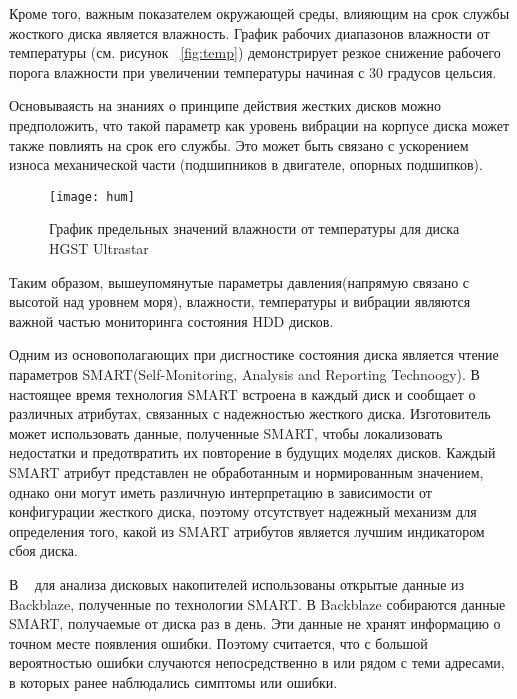 Кроме того, важным показателем окружающей среды, влияющим на срок службы жосткого диска является влажность. График рабочих диапазонов влажности от температуры (см. рисунок ~\ref{fig:temp}) демонстрирует резкое снижение рабочего порога влажности при увеличении температуры начиная с 30 градусов цельсия. 

Основываясть на знаниях о принципе действия жестких дисков можно предположить, что такой параметр как уровень вибрации на корпусе диска может также повлиять на срок его службы. Это может быть связано с ускорением износа механической части (подшипников в двигателе, опорных подшипков).

\begin{figure}[!h]
	\centering
	\texttt{[image: hum]}
	\caption{График предельных значений влажности от температуры для диска HGST Ultrastar}
	\label{fig:hum}
\end{figure}

Таким образом, вышеупомянутые параметры давления(напрямую связано с высотой над уровнем моря), влажности, температуры и вибрации являются важной частью мониторинга состояния HDD дисков. 

Одним из основополагающих при дисгностике состояния диска является чтение параметров SMART(Self-Monitoring, Analysis and Reporting Technoogy). В настоящее время 
технология  SMART  встроена  в  каждый  диск  и  сообщает  о  различных 
атрибутах,  связанных  с  надежностью  жесткого  диска. Изготовитель  может 
использовать данные, полученные SMART, чтобы локализовать недостатки и 
предотвратить их повторение в будущих моделях дисков. Каждый SMART 
атрибут   представлен   не обработанным и нормированным значением, однако они могут иметь различную интерпретацию в зависимости 
от конфигурации жесткого диска, поэтому отсутствует надежный механизм 
для  определения  того,  какой  из  SMART  атрибутов  является  лучшим 
индикатором сбоя диска. 

В ~\cite{diskred} для анализа дисковых накопителей использованы открытые данные из Backblaze,  полученные  по  технологии SMART.  В Backblaze собираются  данные SMART,  получаемые  от диска  раз  в день.  Эти данные не хранят информацию о точном месте появления ошибки. Поэтому считается, что с большой вероятностью ошибки случаются непосредственно в или рядом с теми адресами, в которых ранее наблюдались симптомы или ошибки.

